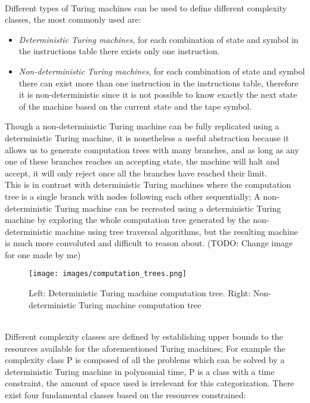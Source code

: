 \\Different types of Turing machines can be used to define different complexity classes, the most commonly used are:
\renewcommand\labelitemi{$\textendash$}
\begin{itemize}
	\item \textit{Deterministic Turing machines}, for each combination of state and symbol in the instructions table there exists only one instruction. 
	\item \textit{Non-deterministic Turing machines}, for each combination of state and symbol there can exist more than one instruction in the instructions table, therefore it is non-deterministic since it is not possible to know exactly the next state of the machine based on the current state and the tape symbol.
\end{itemize}
Though a non-deterministic Turing machine can be fully replicated using a deterministic Turing machine, it is nonetheless a useful abstraction because it allows us to generate computation trees with many branches, and as long as any one of these branches reaches an accepting state, the machine will halt and accept, it will only reject once all the branches have reached their limit. 
\\This is in contrast with deterministic Turing machines where the computation tree is a single branch with nodes following each other sequentially; A non-deterministic Turing machine can be recreated using a deterministic Turing machine by exploring the whole computation tree generated by the non-deterministic machine using tree traversal algorithms, but the resulting machine is much more convoluted and difficult to reason about.
(TODO: Change image for one made by me)
\bigbreak
\begin{figure}[h!]
	\texttt{[image: images/computation\_trees.png]}
	\caption{ Left: Deterministic Turing machine computation tree. Right: Non-deterministic Turing machine computation tree}
	\label{fig:Computation Trees}
\end{figure}
\bigbreak

\\Different complexity classes are defined by establishing upper bounds to the resources available for the aforementioned Turing machines; For example the complexity class P is composed of all the problems which can be solved by a deterministic Turing machine in polynomial time, P is a class with a time constraint, the amount of space used is irrelevant for this categorization.
There exist four fundamental classes based on the resources constrained:

